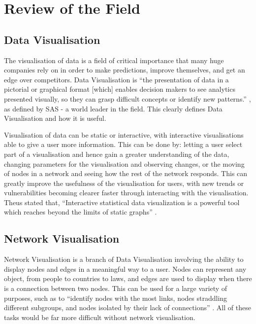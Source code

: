 \documentclass[../dissertation.tex]{subfiles}
\begin{document}
\chapter{Review of the Field}
\label{sec:review-of-field}

\section{Data Visualisation}

The visualisation of data is a field of critical importance that many huge companies rely on in order to make predictions, improve themselves, and get an edge over competitors. Data Visualisation is ``the presentation of data in a pictorial or graphical format [which] enables decision makers to see analytics presented visually, so they can grasp difficult concepts or identify new patterns.'' \cite{sasdv}, as defined by SAS - a world leader in the field. This clearly defines Data Visualisation and how it is useful.

Visualisation of data can be static or interactive, with interactive visualisations able to give a user more information. This can be done by: letting a user select part of a visualisation and hence gain a greater understanding of the data, changing parameters for the visualisation and observing changes, or the moving of nodes in a network and seeing how the rest of the network responds. This can greatly improve the usefulness of the visualisation for users, with new trends or vulnerabilities becoming clearer faster through interacting with the visualisation. Theus stated that, ``Interactive statistical data visualization is a powerful tool which reaches beyond the limits of static graphs'' \cite{theus2002interactive}.

\section{Network Visualisation}

Network Visualisation is a branch of Data Visualisation involving the ability to display nodes and edges in a meaningful way to a user. Nodes can represent any object, from people to countries to laws, and edges are used to display when there is a connection between two nodes. This can be used for a large variety of purposes, such as to ``identify nodes with the most links, nodes straddling different subgroups, and nodes isolated by their lack of connections'' \cite{flowingdata}. All of these tasks would be far more difficult without network visualisation.
\end{document}
